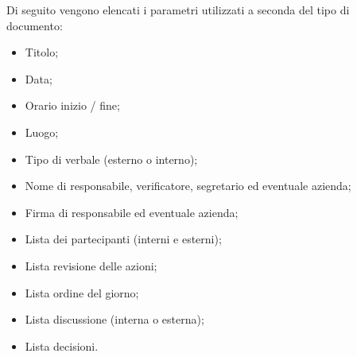 \documentclass[10pt, a4paper]{article}
\begin{document}
    Di seguito vengono elencati i parametri utilizzati a seconda del tipo di documento:
    \begin{itemize}
        \item Titolo;
        \item Data;
        \item Orario inizio / fine;
        \item Luogo;
        \item Tipo di verbale (esterno o interno);
        \item Nome di responsabile, verificatore, segretario ed eventuale azienda;
        \item Firma di responsabile ed eventuale azienda;
        \item Lista dei partecipanti (interni e esterni);
        \item Lista revisione delle azioni;
        \item Lista ordine del giorno;
        \item Lista discussione (interna o esterna);
        \item Lista decisioni.
    \end{itemize}
    
\end{document}
